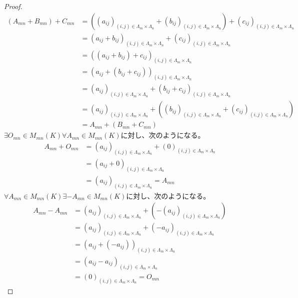 \documentclass[dvipdfmx]{jsarticle}
\begin{document}
\begin{proof}
\begin{align*}
\left( A_{mn} + B_{mn} \right) + C_{mn} &= \left( \left( a_{ij} \right)_{(i,j) \in \varLambda_{m} \times \varLambda_{n}} + \left( b_{ij} \right)_{(i,j) \in \varLambda_{m} \times \varLambda_{n}} \right) + \left( c_{ij} \right)_{(i,j) \in \varLambda_{m} \times \varLambda_{n}}\\
&= \left( a_{ij} + b_{ij} \right)_{(i,j) \in \varLambda_{m} \times \varLambda_{n}} + \left( c_{ij} \right)_{(i,j) \in \varLambda_{m} \times \varLambda_{n}}\\
&= \left( \left( a_{ij} + b_{ij} \right) + c_{ij} \right)_{(i,j) \in \varLambda_{m} \times \varLambda_{n}}\\
&= \left( a_{ij} + \left( b_{ij} + c_{ij} \right) \right)_{(i,j) \in \varLambda_{m} \times \varLambda_{n}}\\
&= \left( a_{ij} \right)_{(i,j) \in \varLambda_{m} \times \varLambda_{n}} + \left( b_{ij} + c_{ij} \right)_{(i,j) \in \varLambda_{m} \times \varLambda_{n}}\\
&= \left( a_{ij} \right)_{(i,j) \in \varLambda_{m} \times \varLambda_{n}} + \left( \left( b_{ij} \right)_{(i,j) \in \varLambda_{m} \times \varLambda_{n}} + \left( c_{ij} \right)_{(i,j) \in \varLambda_{m} \times \varLambda_{n}} \right)\\
&= A_{mn} + \left( B_{mn} + C_{mn} \right)
\end{align*}
$\exists O_{mn} \in M_{mn}(K)\forall A_{mn} \in M_{mn}(K)$に対し、次のようになる。
\begin{align*}
A_{mn} + O_{mn} &= \left( a_{ij} \right)_{(i,j) \in \varLambda_{m} \times \varLambda_{n}} + (0)_{(i,j) \in \varLambda_{m} \times \varLambda_{n}}\\
&= \left( a_{ij} + 0 \right)_{(i,j) \in \varLambda_{m} \times \varLambda_{n}}\\
&= \left( a_{ij} \right)_{(i,j) \in \varLambda_{m} \times \varLambda_{n}} = A_{mn}
\end{align*}
$\forall A_{mn} \in M_{mn}(K)\exists - A_{mn} \in M_{mn}(K)$に対し、次のようになる。
\begin{align*}
A_{mn} - A_{mn} &= \left( a_{ij} \right)_{(i,j) \in \varLambda_{m} \times \varLambda_{n}} + \left( - \left( a_{ij} \right)_{(i,j) \in \varLambda_{m} \times \varLambda_{n}} \right)\\
&= \left( a_{ij} \right)_{(i,j) \in \varLambda_{m} \times \varLambda_{n}} + \left( - a_{ij} \right)_{(i,j) \in \varLambda_{m} \times \varLambda_{n}}\\
&= \left( a_{ij} + \left( - a_{ij} \right) \right)_{(i,j) \in \varLambda_{m} \times \varLambda_{n}}\\
&= \left( a_{ij} - a_{ij} \right)_{(i,j) \in \varLambda_{m} \times \varLambda_{n}}\\
&= (0)_{(i,j) \in \varLambda_{m} \times \varLambda_{n}} = O_{mn}
\end{align*}
\end{proof}
\end{document}
